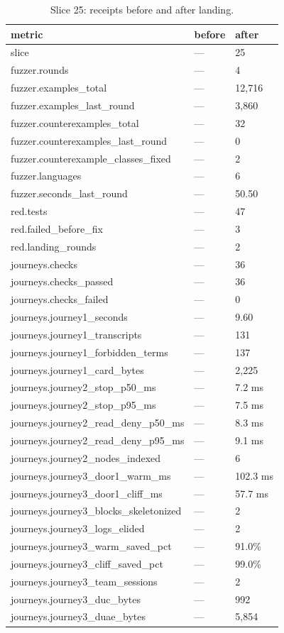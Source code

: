 \documentclass{article}
\begin{document}
\begin{table}[h]
\centering
\begin{tabular}{lll}
\toprule
metric & before & after \\
\midrule
slice & — & 25 \\
fuzzer.rounds & — & 4 \\
fuzzer.examples\_total & — & 12,716 \\
fuzzer.examples\_last\_round & — & 3,860 \\
fuzzer.counterexamples\_total & — & 32 \\
fuzzer.counterexamples\_last\_round & — & 0 \\
fuzzer.counterexample\_classes\_fixed & — & 2 \\
fuzzer.languages & — & 6 \\
fuzzer.seconds\_last\_round & — & 50.50 \\
red.tests & — & 47 \\
red.failed\_before\_fix & — & 3 \\
red.landing\_rounds & — & 2 \\
journeys.checks & — & 36 \\
journeys.checks\_passed & — & 36 \\
journeys.checks\_failed & — & 0 \\
journeys.journey1\_seconds & — & 9.60 \\
journeys.journey1\_transcripts & — & 131 \\
journeys.journey1\_forbidden\_terms & — & 137 \\
journeys.journey1\_card\_bytes & — & 2,225 \\
journeys.journey2\_stop\_p50\_ms & — & 7.2 ms \\
journeys.journey2\_stop\_p95\_ms & — & 7.5 ms \\
journeys.journey2\_read\_deny\_p50\_ms & — & 8.3 ms \\
journeys.journey2\_read\_deny\_p95\_ms & — & 9.1 ms \\
journeys.journey2\_nodes\_indexed & — & 6 \\
journeys.journey3\_door1\_warm\_ms & — & 102.3 ms \\
journeys.journey3\_door1\_cliff\_ms & — & 57.7 ms \\
journeys.journey3\_blocks\_skeletonized & — & 2 \\
journeys.journey3\_logs\_elided & — & 2 \\
journeys.journey3\_warm\_saved\_pct & — & 91.0\% \\
journeys.journey3\_cliff\_saved\_pct & — & 99.0\% \\
journeys.journey3\_team\_sessions & — & 2 \\
journeys.journey3\_duc\_bytes & — & 992 \\
journeys.journey3\_duae\_bytes & — & 5,854 \\
\bottomrule
\end{tabular}
\caption{Slice 25: receipts before and after landing.}
\label{tab:slice25}
\end{table}
\end{document}
